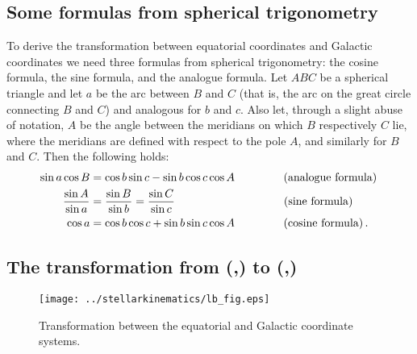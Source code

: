 \subsection{Some formulas from spherical trigonometry}

To derive the transformation between equatorial coordinates and
Galactic coordinates we need three formulas from spherical
trigonometry: the cosine formula, the sine formula, and the analogue
formula. Let $ABC$ be a spherical triangle and let $a$ be the arc
between $B$ and $C$ (that is, the arc on the great circle connecting
$B$ and $C$) and analogous for $b$ and $c$. Also let, through a slight
abuse of notation, $A$ be the angle between the meridians on which $B$
respectively $C$ lie, where the meridians are defined with respect to
the pole $A$, and similarly for $B$ and $C$. Then the following holds:
\begin{align}
\sin a \cos B & = \cos b \sin c - \sin b \cos c \cos A\, \qquad \qquad \, \textnormal{(analogue formula)}\,\label{eq:analogue}\\
\frac{\sin A}{\sin a} & = \frac{\sin B}{\sin b} = \frac{\sin C}{\sin c} \ \ \quad\qquad \qquad\qquad \qquad \textnormal{(sine formula)}\,\label{eq:sineform}\\
\cos a &= \cos b \cos c + \sin b \sin c \cos A\qquad \qquad\ \textnormal{(cosine formula)}\label{eq:cosineform}\, .
\end{align}



\subsection{The transformation from (\ra,\dec) to (\gall,\galb)}

\begin{figure}[htp]
\begin{center}
\texttt{[image: ../stellarkinematics/lb\_fig.eps]}
\caption{Transformation between the equatorial and Galactic coordinate
  systems.}\label{fig:lb}
\end{center}
\end{figure}

